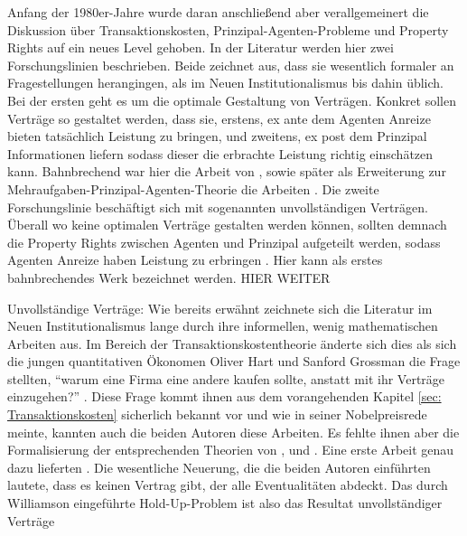 Anfang der 1980er-Jahre wurde daran anschließend aber verallgemeinert die Diskussion über Transaktionskosten, Prinzipal-Agenten-Probleme und Property Rights auf ein neues Level gehoben. In der Literatur \parencite[S. 2]{Nobelpreis-Komitee2016} werden hier zwei Forschungslinien beschrieben. Beide zeichnet aus, dass sie wesentlich formaler an Fragestellungen herangingen, als im Neuen Institutionalismus bis dahin üblich. Bei der ersten geht es um die optimale Gestaltung von Verträgen. Konkret sollen Verträge so gestaltet werden, dass sie, erstens, ex ante dem Agenten Anreize bieten tatsächlich Leistung zu bringen, und zweitens, ex post dem Prinzipal Informationen liefern sodass dieser die erbrachte Leistung richtig einschätzen kann. Bahnbrechend war hier die Arbeit von \textcite{Holmstrom1987}, sowie später als Erweiterung zur Mehraufgaben-Prinzipal-Agenten-Theorie die Arbeiten \textcite{Holmstrom1991, Holmstrom1994}.
Die zweite Forschungslinie beschäftigt sich mit sogenannten unvollständigen Verträgen. Überall wo keine optimalen Verträge gestalten werden können, sollten demnach die Property Rights zwischen Agenten und Prinzipal aufgeteilt werden, sodass Agenten Anreize haben Leistung zu erbringen \parencite[S. 2]{Nobelpreis-Komitee2016}. Hier kann \textcite{Hart1986} als erstes bahnbrechendes Werk bezeichnet werden. HIER WEITER






\textcite{Holmstrom1991, Holmstrom1994}


Unvollständige Verträge: \textcite{Aghion2011}
Wie bereits erwähnt zeichnete sich die Literatur im Neuen Institutionalismus lange durch ihre informellen, wenig mathematischen Arbeiten aus. Im Bereich der Transaktionskostentheorie änderte sich dies als sich die jungen quantitativen Ökonomen Oliver Hart und Sanford Grossman die Frage stellten, "`warum eine Firma eine andere kaufen sollte, anstatt mit ihr Verträge einzugehen?"' \parencite[S. 372]{Hart2016}. Diese Frage kommt ihnen aus dem vorangehenden Kapitel \ref{sec: Transaktionskosten} sicherlich bekannt vor und wie \textcite[S. 372]{Hart2016} in seiner Nobelpreisrede meinte, kannten auch die beiden Autoren diese Arbeiten. Es fehlte ihnen aber die Formalisierung der entsprechenden Theorien von \textcite{Coase1937}, \textcite{Williamson1975} und \textcite{Klein1978}. Eine erste Arbeit genau dazu lieferten \textcite{Hart1986}. Die wesentliche Neuerung, die die beiden Autoren einführten lautete, dass es keinen Vertrag gibt, der alle Eventualitäten abdeckt. Das durch Williamson eingeführte Hold-Up-Problem ist also das Resultat unvollständiger Verträge



